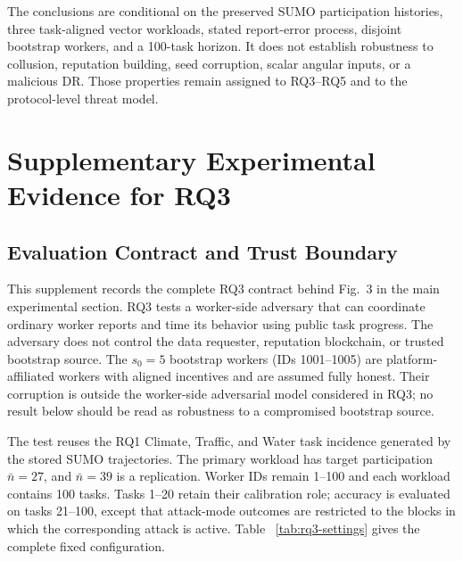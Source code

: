 \documentclass[journal]{IEEEtran}
\begin{document}
The conclusions are conditional on the preserved SUMO participation histories,
three task-aligned vector workloads, stated report-error process, disjoint
bootstrap workers, and a 100-task horizon. It does not establish robustness to
collusion, reputation building, seed corruption, scalar angular inputs, or a
malicious DR. Those properties remain assigned to RQ3--RQ5 and to the
protocol-level threat model.

\FloatBarrier
\section{Supplementary Experimental Evidence for RQ3}

\let\originalsection\section
\renewcommand{\section}{\subsection}
\section{Evaluation Contract and Trust Boundary}
\label{app:rq3-contract}

This supplement records the complete RQ3 contract behind Fig.~3 in the main
experimental section. RQ3 tests a worker-side adversary that can coordinate
ordinary worker reports and time its behavior using public task progress. The
adversary does not control the data requester, reputation blockchain, or trusted
bootstrap source. The $s_0=5$ bootstrap workers (IDs 1001--1005) are
platform-affiliated workers with aligned incentives and are assumed fully
honest. Their corruption is outside the worker-side adversarial model considered
in RQ3; no result below should be read as robustness to a compromised bootstrap
source.

The test reuses the RQ1 Climate, Traffic, and Water task incidence generated by
the stored SUMO trajectories. The primary workload has target participation
$\bar n=27$, and $\bar n=39$ is a replication. Worker IDs remain 1--100 and
each workload contains 100 tasks. Tasks 1--20 retain their calibration role;
accuracy is evaluated on tasks 21--100, except that attack-mode outcomes are
restricted to the blocks in which the corresponding attack is active. Table~
\ref{tab:rq3-settings} gives the complete fixed configuration.
\end{document}
